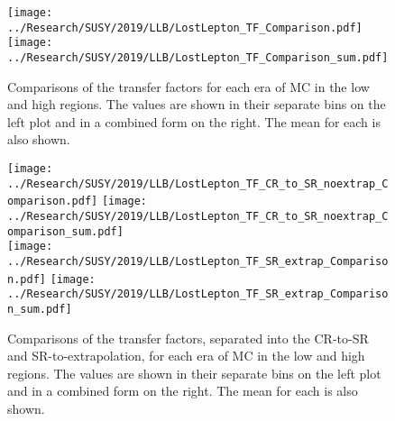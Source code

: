 \begin{figure}[!htb]
	\begin{center}
  \texttt{[image: ../Research/SUSY/2019/LLB/LostLepton\_TF\_Comparison.pdf]}
  \texttt{[image: ../Research/SUSY/2019/LLB/LostLepton\_TF\_Comparison\_sum.pdf]} \\
	\end{center}
	\caption{Comparisons of the transfer factors for each era of MC in the low and high \dm{} regions. The values are shown in their separate bins on the left plot and in a combined form on the right. The mean for each is also shown. 
	 }
	\label{fig:llb-1lcr-datavsmc-total-tf}
\end{figure}
\begin{figure}[!htb]
	\begin{center}  
		\texttt{[image: ../Research/SUSY/2019/LLB/LostLepton\_TF\_CR\_to\_SR\_noextrap\_Comparison.pdf]}
		\texttt{[image: ../Research/SUSY/2019/LLB/LostLepton\_TF\_CR\_to\_SR\_noextrap\_Comparison\_sum.pdf]} \\
		\texttt{[image: ../Research/SUSY/2019/LLB/LostLepton\_TF\_SR\_extrap\_Comparison.pdf]}
		\texttt{[image: ../Research/SUSY/2019/LLB/LostLepton\_TF\_SR\_extrap\_Comparison\_sum.pdf]}
	\end{center}
	\caption{Comparisons of the transfer factors, separated into the CR-to-SR and SR-to-extrapolation, for each era of MC in the low and high \dm{} regions. The values are shown in their separate bins on the left plot and in a combined form on the right. The mean for each is also shown. 
	 }
	\label{fig:llb-1lcr-datavsmc-sep-tf}
\end{figure}
